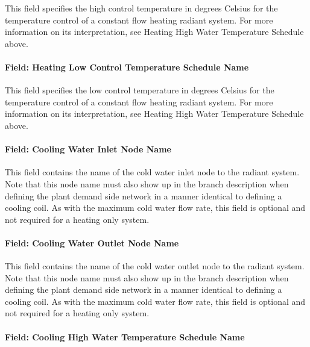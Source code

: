 This field specifies the high control temperature in degrees Celsius for the temperature control of a constant flow heating radiant system. For more information on its interpretation, see Heating High Water Temperature Schedule above.

\paragraph{Field: Heating Low Control Temperature Schedule Name}\label{field-heating-low-control-temperature-schedule-name}

This field specifies the low control temperature in degrees Celsius for the temperature control of a constant flow heating radiant system. For more information on its interpretation, see Heating High Water Temperature Schedule above.

\paragraph{Field: Cooling Water Inlet Node Name}\label{field-cooling-water-inlet-node-name-1}

This field contains the name of the cold water inlet node to the radiant system. Note that this node name must also show up in the branch description when defining the plant demand side network in a manner identical to defining a cooling coil. As with the maximum cold water flow rate, this field is optional and not required for a heating only system.

\paragraph{Field: Cooling Water Outlet Node Name}\label{field-cooling-water-outlet-node-name-1}

This field contains the name of the cold water outlet node to the radiant system. Note that this node name must also show up in the branch description when defining the plant demand side network in a manner identical to defining a cooling coil. As with the maximum cold water flow rate, this field is optional and not required for a heating only system.

\paragraph{Field: Cooling High Water Temperature Schedule Name}\label{field-cooling-high-water-temperature-schedule-name}

